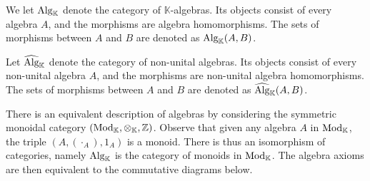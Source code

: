 \documentclass[../thesis.tex]{subfiles}
\begin{document}
            \begin{definition}
                We let $\tt{Alg}_{\mathbb{K}}$ denote the category of $\mathbb{K}$-algebras. Its objects consist of every algebra $A$, and the morphisms are algebra homomorphisms. The sets of morphisms between $A$ and $B$ are denoted as $\tt{Alg}_{\mathbb{K}}(A,B)$.
                
                Let $\widehat{\tt{Alg}}_{\mathbb{K}}$ denote the category of non-unital algebras. Its objects consist of every non-unital algebra $A$, and the morphisms are non-unital algebra homomorphisms. The sets of morphisms between $A$ and $B$ are denoted as $\widehat{\tt{Alg}}_{\mathbb{K}}(A,B)$.
            \end{definition}

            There is an equivalent description of algebras by considering the symmetric monoidal category $(\tt{Mod}_\mathbb{K},\otimes_\mathbb{K},\mathbb{Z})$. Observe that given any algebra $A$ in $\tt{Mod}_\mathbb{K}$, the triple $(A,(\cdot_A),1_A)$ is a monoid. There is thus an isomorphism of categories, namely $\tt{Alg}_\mathbb{K}$ is the category of monoids in $\tt{Mod}_\mathbb{K}$. The algebra axioms are then equivalent to the commutative diagrams below.
            \begin{center}
                 \quad
            \end{center}
\end{document}
